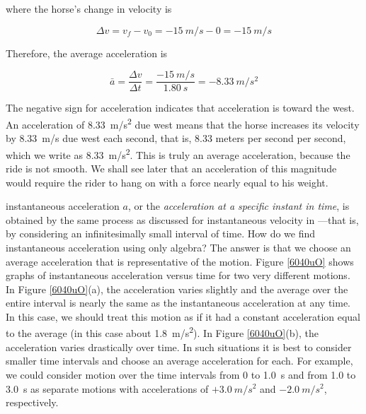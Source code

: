\documentclass[../../main-ap-physics.tex]{subfiles}
\begin{document}
where the horse's change in velocity is

\begin{equation*}
    \Delta{v} = v_f - v_0 = -\SI{15}{m/s} - 0 = \SI{-15}{m/s}
\end{equation*}

Therefore, the average acceleration is

\begin{equation*}
    \bar{a} = \frac{\Delta v}{\Delta t} = \frac{-\SI{15}{m/s}}{\SI{1.80}{s}} = -\SI{8.33}{m/s^2}
\end{equation*}

The negative sign for acceleration indicates that acceleration is toward the west. An acceleration of \SI{8.33}{m/s^2} due west means that the horse increases its velocity by \SI{8.33}{m/s} due west each second, that is, 8.33 meters per second per second, which we write as \SI{8.33}{m/s^2}. This is truly an average acceleration, because the ride is not smooth. We shall see later that an acceleration of this magnitude would require the rider to hang on with a force nearly equal to his weight.

\endsolution

\Gls{instantaneous acceleration} $a$, or the \textit{acceleration at a specific instant in time}, is obtained by the same process as discussed for instantaneous velocity in ---that is, by considering an infinitesimally small interval of time. How do we find instantaneous acceleration using only algebra? The answer is that we choose an average acceleration that is representative of the motion. Figure \ref{6040uO} shows graphs of instantaneous acceleration versus time for two very different motions. In Figure \ref{6040uO}(a), the acceleration varies slightly and the average over the entire interval is nearly the same as the instantaneous acceleration at any time. In this case, we should treat this motion as if it had a constant acceleration equal to the average (in this case about \SI{1.8}{m/s^2}). In Figure \ref{6040uO}(b), the acceleration varies drastically over time. In such situations it is best to consider smaller time intervals and choose an average acceleration for each. For example, we could consider motion over the time intervals from 0 to \SI{1.0}{s} and from 1.0 to \SI{3.0}{s} as separate motions with accelerations of $+\SI{3.0}{m/s^2}$ and $-\SI{2.0}{m/s^2}$, respectively.
\end{document}

